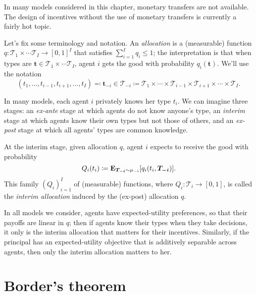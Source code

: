 In many models considered in this chapter, monetary transfers are not available.
The design of incentives without the use of monetary transfers is currently a fairly hot topic.


Let's fix some terminology and notation.
An \emph{allocation} is a (measurable) function $q : \mathcal{T}_1 \times \cdots \mathcal{T}_I \to [0,1]^I$ that satisfies $\sum_{i=1}^I q_i \leq 1$;
the interpretation is that when types are $\boldsymbol{t} \in \mathcal{T}_1 \times \cdots \mathcal{T}_I$, agent $i$ gets the good with probability $q_i(\boldsymbol{t})$.
We'll use the notation
%
\begin{equation*}
	(t_1,\dots,t_{i-1},t_{i+1},\dots,t_I)
	\eqqcolon \boldsymbol{t}_{-i}
	\in \mathcal{T}_{-i}
	\coloneqq \mathcal{T}_1 \times \cdots \times \mathcal{T}_{i-1}
	\times \mathcal{T}_{i+1} \times \cdots \times \mathcal{T}_I .
\end{equation*}

In many models, each agent $i$ privately knows her type $t_i$.
We can imagine three stages:
an \emph{ex-ante} stage at which agents do not know anyone's type,
an \emph{interim} stage at which agents know their own types but not those of others,
and an \emph{ex-post} stage at which all agents' types are common knowledge.

At the interim stage, given allocation $q$, agent $i$ expects to receive the good with probability
%
\begin{equation*}
	Q_i(t_i)
	\coloneqq \E_{\boldsymbol{T_{-i}} \sim \mu_{-i}}\left[ q_i(t_i,\boldsymbol{T_{-i}}) \right] .
\end{equation*}
%
This family $(Q_i)_{i=1}^I$ of (measurable) functions, where $Q_i : \mathcal{T}_i \to [0,1]$,
is called the \emph{interim allocation} induced by the (ex-post) allocation $q$.

In all models we consider, agents have expected-utility preferences, so that their payoffs are linear in $q$; then if agents know their types when they take decisions, it only is the interim allocation that matters for their incentives.
Similarly, if the principal has an expected-utility objective that is additively separable across agents, then only the interim allocation matters to her.



\section{Border's theorem}
\label{sec:ch2:border}

